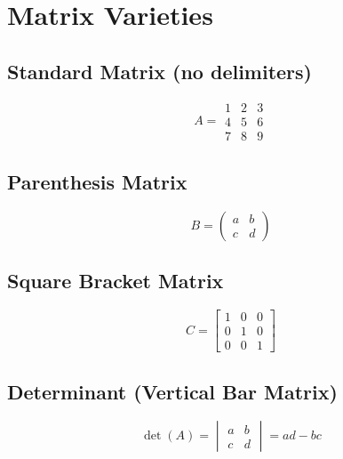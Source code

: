 \documentclass{article}
\begin{document}
\section{Matrix Varieties}

\subsection{Standard Matrix (no delimiters)}

\begin{equation}
A = \begin{matrix}
  1 & 2 & 3 \\
  4 & 5 & 6 \\
  7 & 8 & 9
\end{matrix}
\end{equation}

\subsection{Parenthesis Matrix}

\begin{equation}
B = \begin{pmatrix}
  a & b \\
  c & d
\end{pmatrix}
\end{equation}

\subsection{Square Bracket Matrix}

\begin{equation}
C = \begin{bmatrix}
  1 & 0 & 0 \\
  0 & 1 & 0 \\
  0 & 0 & 1
\end{bmatrix}
\end{equation}

\subsection{Determinant (Vertical Bar Matrix)}

\begin{equation}
\det(A) = \begin{vmatrix}
  a & b \\
  c & d
\end{vmatrix} = ad - bc
\end{equation}
\end{document}
